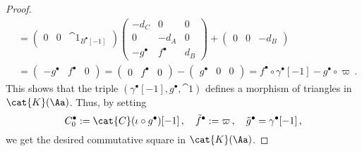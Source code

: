 \begin{prop}
\begin{proof}
\begin{align*}
            &= \begin{pmatrix}
                0 & 0 & \cat{1}_{B^{\bullet}[-1]}
            \end{pmatrix}
            \begin{pmatrix}
                -d_{C} & 0 & 0 \\ 0 & -d_{A} & 0 \\ -g^{\bullet} & f^{\bullet} & d_{B}
            \end{pmatrix}
            +  \begin{pmatrix}
                0 & 0 & -d_{B}
            \end{pmatrix}   \\
            &= \begin{pmatrix}
                -g^{\bullet} & f^{\bullet} & 0
            \end{pmatrix} 
            = \begin{pmatrix}
                0 & f^{\bullet} & 0
            \end{pmatrix} 
            - \begin{pmatrix}
                g^{\bullet} & 0 & 0
            \end{pmatrix}
            = f^{\bullet} \circ \gamma^{\bullet}[-1] - g^{\bullet} \circ \varpi\,.
        \end{align*}
        This shows that the triple $(\gamma^{\bullet}[-1],g^{\bullet}, \cat{1})$
        defines a morphism of triangles in $\cat{K}(\Aa)$.
        Thus, by setting 
        $$C_{0}^{\bullet} := \cat{C}(\iota \circ g^{\bullet})[-1]\,, \quad
        \Tilde{f}^{\bullet} := \varpi \,, \quad  
        \Tilde{g}^{\bullet} = \gamma^{\bullet}[-1]\,,$$
        we get the desired commutative square in $\cat{K}(\Aa)$.
        

\end{proof}
\end{prop}
